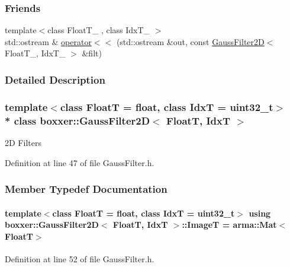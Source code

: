 \subsubsection*{Friends}
\begin{DoxyCompactItemize}
\item 
{\footnotesize template$<$class Float\+T\+\_\+ , class Idx\+T\+\_\+ $>$ }\\std\+::ostream \& \hyperlink{classboxxer_1_1GaussFilter2D_abb41be01824fced1029c5fc686a80d98}{operator$<$$<$} (std\+::ostream \&out, const \hyperlink{classboxxer_1_1GaussFilter2D}{Gauss\+Filter2D}$<$ Float\+T\+\_\+, Idx\+T\+\_\+ $>$ \&filt)
\end{DoxyCompactItemize}


\subsubsection{Detailed Description}
\subsubsection*{template$<$class FloatT = float, class IdxT = uint32\+\_\+t$>$\\*
class boxxer\+::\+Gauss\+Filter2\+D$<$ Float\+T, Idx\+T $>$}

2D Filters 

Definition at line 47 of file Gauss\+Filter.\+h.



\subsubsection{Member Typedef Documentation}
\paragraph[{\texorpdfstring{ImageT}{ImageT}}]{\setlength{\rightskip}{0pt plus 5cm}template$<$class FloatT  = float, class IdxT  = uint32\+\_\+t$>$ using {\bf boxxer\+::\+Gauss\+Filter2D}$<$ FloatT, IdxT $>$\+::{\bf ImageT} =  arma\+::\+Mat$<$FloatT$>$}\hypertarget{classboxxer_1_1GaussFilter2D_ae23c8679409815813d371743d9645565}{}\label{classboxxer_1_1GaussFilter2D_ae23c8679409815813d371743d9645565}


Definition at line 52 of file Gauss\+Filter.\+h.

